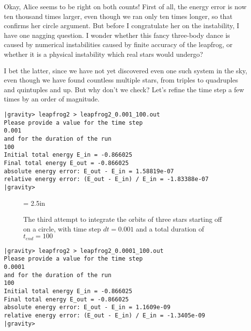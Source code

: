\abc

\bob
Okay, Alice seems to be right on both counts!  First of all, the
energy error is now ten thousand times larger, even though we ran only
ten times longer, so that confirms her circle argument.  But before I
congratulate her on the instability, I have one nagging question.
I wonder whether this fancy three-body dance is caused by numerical
instabilities caused by finite accuracy of the leapfrog, or whether it
is a physical instability which real stars would undergo?

\alice
I bet the latter, since we have not yet discovered even one such
system in the sky, even though we have found countless multiple stars,
from triples to quadruples and quintuples and up.  But why don't we
check?  Let's refine the time step a few times by an order of magnitude.

\cba

\begin{small}
\begin{verbatim}
|gravity> leapfrog2 > leapfrog2_0.001_100.out
Please provide a value for the time step
0.001
and for the duration of the run
100
Initial total energy E_in = -0.866025
Final total energy E_out = -0.866025
absolute energy error: E_out - E_in = 1.58819e-07
relative energy error: (E_out - E_in) / E_in = -1.83388e-07
|gravity>
\end{verbatim}
\end{small}

\begin{figure}[htb]
\begin{center}
\epsfxsize = 2.5in
\caption[Three stars on a circle, leapfrog, $dt = 0.001$, $t_{end} = 100$]
{The third attempt to integrate the orbits of three stars
starting off on a circle, with time step $dt = 0.001$ and a total
duration of $t_{end} = 100$}
\label{fig:leap2-0.001-100}
\end{center}
\end{figure}

\begin{small}
\begin{verbatim}
|gravity> leapfrog2 > leapfrog2_0.0001_100.out
Please provide a value for the time step
0.0001
and for the duration of the run
100
Initial total energy E_in = -0.866025
Final total energy E_out = -0.866025
absolute energy error: E_out - E_in = 1.1609e-09
relative energy error: (E_out - E_in) / E_in = -1.3405e-09
|gravity>
\end{verbatim}
\end{small}


